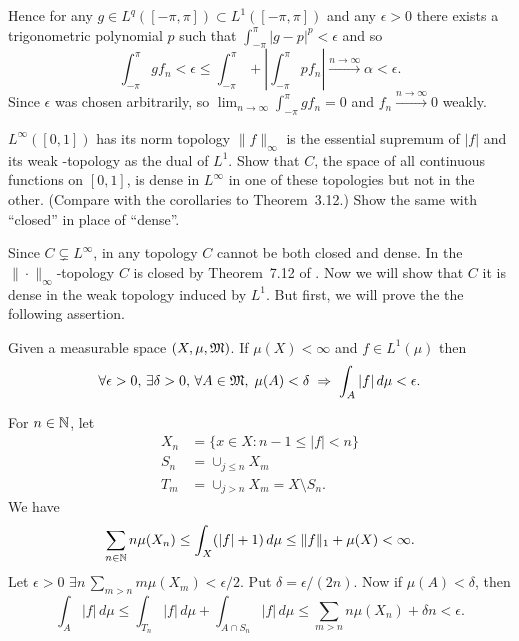 \begin{enumerate}
Hence for any \(g\in L^q([-\pi,\pi]) \subset L^1([-\pi,\pi])\)
and any \(\epsilon>0\) there exists a trigonometric polynomial $p$
such that \(\int_{-\pi}^\pi |g-p|^p<\epsilon\) and so
\begin{equation*}
\int_{-\pi}^\pi gf_n<\epsilon
\leq \int_{-\pi}^\pi +\left|\int_{-\pi}^\pi  pf_n\right|
\stackrel{n\to\infty}{\longrightarrow} \alpha < \epsilon.
\end{equation*}
Since \(\epsilon\) was chosen arbitrarily, so
\(\lim_{n\to\infty}\int_{-\pi}^\pi  gf_n = 0\) and
\(f_n \stackrel{n\to\infty}{\longrightarrow} 0\) weakly.


\begin{excopy}
\(L^\infty([0,1])\) has its norm topology
\(\|f\|_\infty\) is the essential supremum of \(|f|\) and
its weak \upstar-topology as the dual of \(L^1\).
Show that $C$, the space of all continuous functions on \([0,1]\),
is dense in \(L^\infty\) in one of these topologies but not in the other.
(Compare with the corollaries to Theorem~3.12.)
Show the same with ``closed'' in place of ``dense''.
\end{excopy}

Since \(C \subsetneq L^\infty\),
in any topology $C$ cannot be both closed and dense.
In the \(\|\cdot\|_\infty\)-topology $C$ is closed by
Theorem~7.12 of \cite{RudinPMA85}.
Now we will show that $C$ it is dense in the weak topology induced by \(L^1\).
But first, we will prove the the following assertion.
\begin{llem}
Given a measurable space \((X,\mu,\mathfrak{M})\).
If \(\mu(X)<\infty\) and \(f\in L^1(\mu)\) then
\begin{equation*}
\forall \epsilon>0,\, \exists \delta>0,\, \forall A\in\mathfrak{M}, \;
  \mu(A) < \delta \;\Rightarrow\; \int_A|f|\,d\mu < \epsilon.
\end{equation*}
\end{llem}
\begin{thmproof}
For \(n\in\mathbb{N}\), let
\begin{align*}
X_n &= \{x\in X: n-1 \leq |f|<n\} \\
S_n &= \cup_{j\leq n} X_m \\
T_m &= \cup_{j>n} X_m = X \setminus S_n.
\end{align*}
We have
\begin{equation*}
\sum_{n\in\mathbb{N}} n\mu(X_n) \leq \int_X(|f|+1)\,d\mu \leq \|f\|_1+\mu(X) < \infty.
\end{equation*}
Let \(\epsilon>0\) \(\exists n\, \sum_{m>n} m\mu(X_m) < \epsilon/2\).
Put \(\delta = \epsilon/(2n)\).
Now if \(\mu(A)<\delta\), then
\begin{equation*}
\int_A|f|\,d\mu
\leq \int_{T_n} |f|\,d\mu +  \int_{A\cap S_n} |f|\,d\mu
\leq \sum_{m>n} n\mu(X_n) + \delta n < \epsilon.
\end{equation*}
\end{thmproof}


\end{enumerate}
